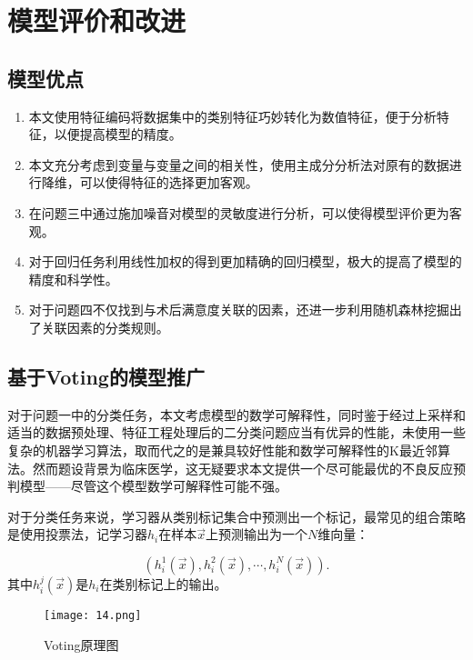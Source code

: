 \section{模型评价和改进}

\subsection{模型优点}

\begin{enumerate}
  \item 本文使用特征编码将数据集中的类别特征巧妙转化为数值特征，便于分析特征，以便提高模型的精度。
  \item 本文充分考虑到变量与变量之间的相关性，使用主成分分析法对原有的数据进行降维，可以使得特征的选择更加客观。
  \item 在问题三中通过施加噪音对模型的灵敏度进行分析，可以使得模型评价更为客观。
  \item 对于回归任务利用线性加权的得到更加精确的回归模型，极大的提高了模型的精度和科学性。
  \item 对于问题四不仅找到与术后满意度关联的因素，还进一步利用随机森林挖掘出了关联因素的分类规则。
\end{enumerate}




\subsection{基于Voting的模型推广}

对于问题一中的分类任务，本文考虑模型的数学可解释性，同时鉴于经过上采样和适当的数据预处理、特征工程处理后的二分类问题应当有优异的性能，未使用一些复杂的机器学习算法，取而代之的是兼具较好性能和数学可解释性的K最近邻算法。然而题设背景为临床医学，这无疑要求本文提供一个尽可能最优的不良反应预判模型——尽管这个模型数学可解释性可能不强。

对于分类任务来说，学习器从类别标记集合中预测出一个标记，最常见的组合策略是使用投票法，记学习器${{h}_{i}}$在样本$\overrightarrow{x}$上预测输出为一个$N$维向量：

\begin{equation}
    \left( h_{i}^{1}\left( \overrightarrow{x} \right),h_{i}^{2}\left( \overrightarrow{x} \right),\cdots ,h_{i}^{N}\left( \overrightarrow{x} \right) \right).
\end{equation}
其中$h_{i}^{j}\left( \overrightarrow{x} \right)$是${{h}_{i}}$在类别标记上的输出。

\begin{figure}[H] %
	\centering %
	\texttt{[image: 14.png]} 
	\caption{Voting原理图} 
	\label{Fig.main14} 
\end{figure}


